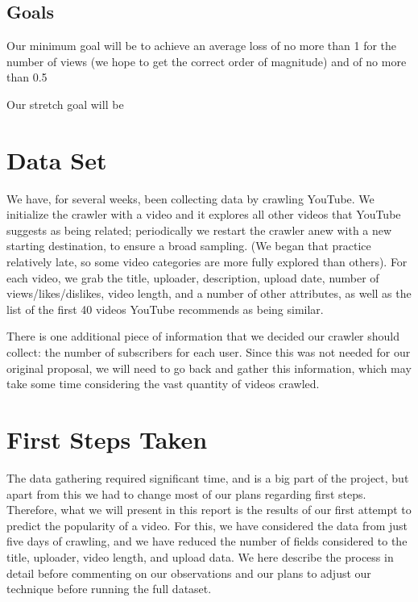 \documentclass{article} %
\begin{document}
\subsection{Goals}

Our minimum goal will be to achieve an average loss of no more than 1 for the number of views (we hope to get the correct order of magnitude) and of no more than 0.5%

Our stretch goal will be

\section{Data Set}

We have, for several weeks, been collecting data by crawling YouTube.  We initialize the crawler with a video and it explores all other videos that YouTube suggests as being related; periodically we restart the crawler anew with a new starting destination, to ensure a broad sampling.  (We began that practice relatively late, so some video categories are more fully explored than others).  For each video, we grab the title, uploader, description, upload date, number of views/likes/dislikes, video length, and a number of other attributes, as well as the list of the first 40 videos YouTube recommends as being similar.

There is one additional piece of information that we decided our crawler should collect: the number of subscribers for each user.  Since this was not needed for our original proposal, we will need to go back and gather this information, which may take some time considering the vast quantity of videos crawled.

\section{First Steps Taken}

The data gathering required significant time, and is a big part of the project, but apart from this we had to change most of our plans regarding first steps.  Therefore, what we will present in this report is the results of our first attempt to predict the popularity of a video.  For this, we have considered the data from just five days of crawling, and we have reduced the number of fields considered to the title, uploader, video length, and upload data.  We here describe the process in detail before commenting on our observations and our plans to adjust our technique before running the full dataset.
\end{document}
